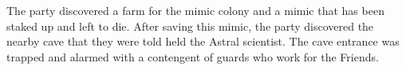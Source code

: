 The party discovered a farm for the mimic colony and a mimic that has been staked up and left to die.
After saving this mimic, the party discovered the nearby cave that they were told held the Astral scientist.
The cave entrance was trapped and alarmed with a contengent of guards who work for the Friends.